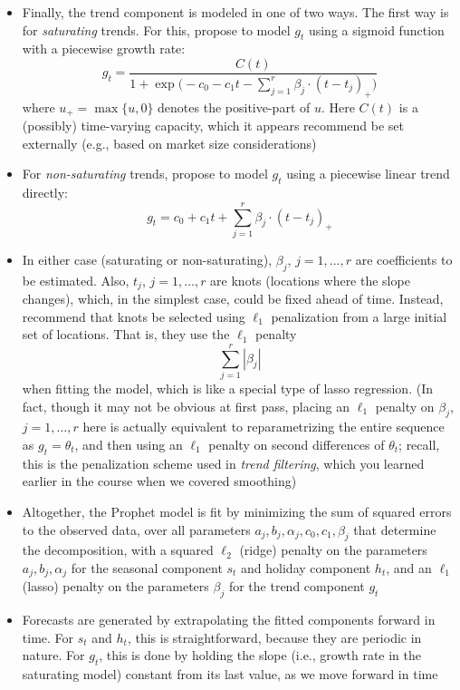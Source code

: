 \documentclass{article}
\begin{document}
\begin{itemize}
\item Finally, the trend component is modeled in one of two ways. The first way
  is for \emph{saturating} trends. For this, \citet{taylor2018forecasting}
  propose to model $g_t$ using a sigmoid function with a piecewise growth rate:  
  \[
  g_t = \frac{C(t)}{1 + \exp\Big( -c_0 - c_1 t - \sum_{j=1}^r \beta_j \cdot
    (t-t_j)_+\Big)}  
  \]
  where $u_+ = \max\{u,0\}$ denotes the positive-part of $u$.
  Here $C(t)$ is a (possibly) time-varying capacity, which it appears 
  \citet{taylor2018forecasting} recommend be set externally (e.g., based on  
  market size considerations)

\item For \emph{non-saturating} trends, \citet{taylor2018forecasting}
  propose to model $g_t$ using a piecewise linear trend directly: 
  \[
  g_t = c_0 + c_1 t + \sum_{j=1}^r \beta_j \cdot (t-t_j)_+ 
  \]

\item In either case (saturating or non-saturating), $\beta_j$, $j = 1,\dots,r$
  are coefficients to be estimated. Also, $t_j$, $j = 1,\dots,r$ are knots
  (locations where the slope changes), which, in the simplest case, could be
  fixed ahead of time. Instead, \citet{taylor2018forecasting} recommend that
  knots be selected using $\ell_1$ penalization from a large initial set of 
  locations. That is, they use the $\ell_1$ penalty 
  \[
  \sum_{j=1}^r |\beta_j|
  \]
  when fitting the model, which is like a special type of lasso regression. (In
  fact, though it may not be obvious at first pass, placing an $\ell_1$ penalty
  on $\beta_j$, $j = 1,\dots,r$ here is actually equivalent to reparametrizing
  the entire sequence as $g_t = \theta_t$, and then using an $\ell_1$ penalty on  
  second differences of $\theta_t$; recall, this is the penalization scheme used
  in \emph{trend filtering}, which you learned earlier in the course when we
  covered smoothing)   

\item Altogether, the Prophet model is fit by minimizing the sum of squared
  errors to the observed data, over all parameters
  $a_j,b_j,\alpha_j,c_0,c_1,\beta_j$ that determine the decomposition, with a
  squared $\ell_2$ (ridge) penalty on the parameters $a_j,b_j,\alpha_j$ for the
  seasonal component $s_t$ and holiday component $h_t$, and an $\ell_1$ (lasso)
  penalty on the parameters $\beta_j$ for the trend component $g_t$  

\item Forecasts are generated by extrapolating the fitted components forward in 
  time. For $s_t$ and $h_t$, this is straightforward, because they are periodic
  in nature. For $g_t$, this is done by holding the slope (i.e., growth rate in
  the saturating model) constant from its last value, as we move forward in
  time 


\end{itemize}
\end{document}
